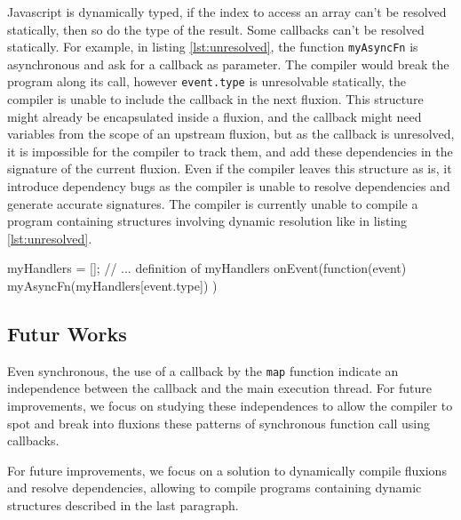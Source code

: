 
Javascript is dynamically typed, if the index to access an array can't be resolved statically, then so do the type of the result.
Some callbacks can't be resolved statically.
For example, in listing \ref{lst:unresolved}, the function \texttt{myAsyncFn} is asynchronous and ask for a callback as parameter.
The compiler would break the program along its call, however \texttt{event.type} is unresolvable statically, the compiler is unable to include the callback in the next fluxion.
This structure might already be encapsulated inside a fluxion, and the callback might need variables from the scope of an upstream fluxion, but as the callback is unresolved, it is impossible for the compiler to track them, and add these dependencies in the signature of the current fluxion.
Even if the compiler leaves this structure as is, it introduce dependency bugs as the compiler is unable to resolve dependencies and generate accurate signatures.
The compiler is currently unable to compile a program containing structures involving dynamic resolution like in listing \ref{lst:unresolved}.

\begin{code}[Javascript, caption={Example of an unresolvable callback},label={lst:unresolved}]
myHandlers = [];
// ... definition of myHandlers
onEvent(function(event) {
  myAsyncFn(myHandlers[event.type])
})
\end{code}


\subsection{Futur Works}

Even synchronous, the use of a callback by the \texttt{map} function indicate an independence between the callback and the main execution thread.
For future improvements, we focus on studying these independences to allow the compiler to spot and break into fluxions these patterns of synchronous function call using callbacks.

For future improvements, we focus on a solution to dynamically compile fluxions and resolve dependencies, allowing to compile programs containing dynamic structures described in the last paragraph.


